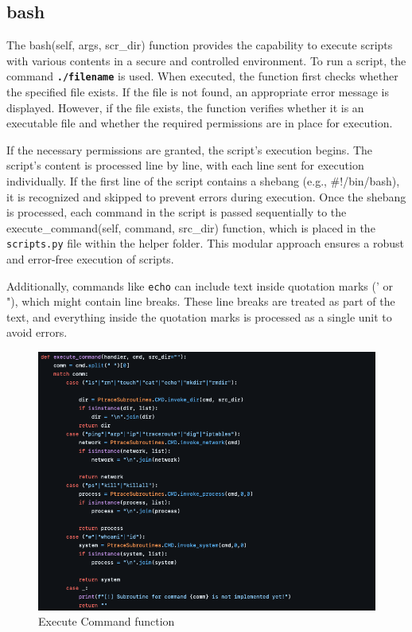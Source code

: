 \subsection{bash}

The bash(self, args, scr\_dir) function provides the capability to execute scripts with various contents in a secure and controlled environment. To run a script, the command \textbf{\texttt{./{filename}}} is used. When executed, the function first checks whether the specified file exists. If the file is not found, an appropriate error message is displayed. However, if the file exists, the function verifies whether it is an executable file and whether the required permissions are in place for execution.

If the necessary permissions are granted, the script's execution begins. The script's content is processed line by line, with each line sent for execution individually. If the first line of the script contains a shebang (e.g., \#!/bin/bash), it is recognized and skipped to prevent errors during execution. Once the shebang is processed, each command in the script is passed sequentially to the execute\_command(self, command, src\_dir) function, which is placed in the \texttt{scripts.py} file within the helper folder. This modular approach ensures a robust and error-free execution of scripts.

Additionally, commands like \texttt{echo} can include text inside quotation marks (' or "), which might contain line breaks. These line breaks are treated as part of the text, and everything inside the quotation marks is processed as a single unit to avoid errors.

\begin{figure}[H]
    \centering
    \includegraphics[width=1\linewidth]{bilder/execute_command.PNG}
    \caption{Execute Command function}
\end{figure}

